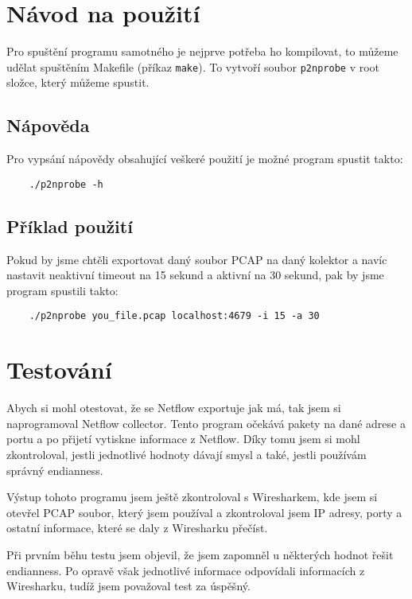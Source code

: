 \documentclass{article}
\begin{document}
\section{Návod na použití}
Pro spuštění programu samotného je nejprve potřeba ho kompilovat, to můžeme
udělat spuštěním Makefile (příkaz \texttt{make}). To vytvoří soubor
\texttt{p2nprobe} v root složce, který můžeme spustit.

\subsection{Nápověda}
Pro vypsání nápovědy obsahující veškeré použití je možné program spustit takto:
\begin{verbatim}
    ./p2nprobe -h
\end{verbatim}

\subsection{Příklad použití}
Pokud by jsme chtěli exportovat daný soubor PCAP na daný kolektor a navíc
nastavit neaktivní timeout na 15 sekund a aktivní na 30 sekund, pak by jsme
program spustili takto:
\begin{verbatim}
    ./p2nprobe you_file.pcap localhost:4679 -i 15 -a 30
\end{verbatim}

\section{Testování}
Abych si mohl otestovat, že se Netflow exportuje jak má, tak jsem si
naprogramoval Netflow collector. Tento program očekává pakety na dané adrese
a portu a po přijetí vytiskne informace z Netflow. Díky tomu jsem si mohl
zkontroloval, jestli jednotlivé hodnoty dávají smysl a také, jestli používám
správný endianness.

Výstup tohoto programu jsem ještě zkontroloval s Wiresharkem, kde jsem si
otevřel PCAP soubor, který jsem používal a zkontroloval jsem IP adresy, porty
a ostatní informace, které se daly z Wiresharku přečíst.

Při prvním běhu testu jsem objevil, že jsem zapomněl u některých hodnot řešit
endianness. Po opravě však jednotlivé informace odpovídali informacích z
Wiresharku, tudíž jsem považoval test za úspěšný.

\nocite{*}
\printbibliography[title={Reference}]
\end{document}
